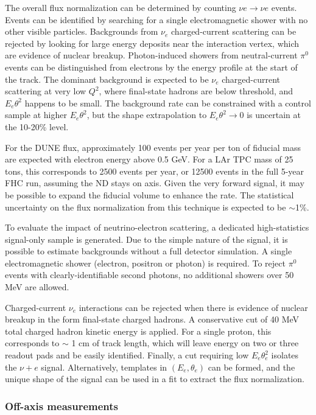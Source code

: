 The overall flux normalization can be determined by counting $\nu e \rightarrow \nu e$ events. Events can be identified by searching for a single electromagnetic shower with no other visible particles. Backgrounds from $\nu_{e}$ charged-current scattering can be rejected by looking for large energy deposits near the interaction vertex, which are evidence of nuclear breakup. Photon-induced showers from neutral-current $\pi^{0}$ events can be distinguished from electrons by the energy profile at the start of the track. The dominant background is expected to be $\nu_{e}$ charged-current scattering at very low $Q^{2}$, where final-state hadrons are below threshold, and $E_{e}\theta^{2}$ happens to be small. The background rate can be constrained with a control sample at higher $E_{e}\theta^{2}$, but the shape extrapolation to $E_{e}\theta^{2} \rightarrow 0$ is uncertain at the 10-20\% level.

For the DUNE flux, approximately 100 events per year per ton of fiducial mass are expected with electron energy above 0.5 GeV. For a LAr TPC mass of 25 tons, this corresponds to 2500 events per year, or 12500 events in the full 5-year FHC run, assuming the ND stays on axis. Given the very forward signal, it may be possible to expand the fiducial volume to enhance the rate. The statistical uncertainty on the flux normalization from this technique is expected to be $\sim$1\%.

To evaluate the impact of neutrino-electron scattering, a dedicated high-statistics signal-only sample is generated. Due to the simple nature of the signal, it is possible to estimate backgrounds without a full detector simulation. A single electromagnetic shower (electron, positron or photon) is required. To reject $\pi^{0}$ events with clearly-identifiable second photons, no additional showers over 50 MeV are allowed.

Charged-current $\nu_{e}$ interactions can be rejected when there is evidence of nuclear breakup in the form final-state charged hadrons. A conservative cut of 40 MeV total charged hadron kinetic energy is applied. For a single proton, this corresponds to $\sim$ 1 cm of track length, which will leave energy on two or three readout pads and be easily identified. Finally, a cut requiring low $E_{e}\theta_{e}^{2}$ isolates the $\nu+e$ signal. Alternatively, templates in $(E_{e}, \theta_{e})$ can be formed, and the unique shape of the signal can be used in a fit to extract the flux normalization.

\subsubsection{Off-axis  measurements}
\label{sec:ch-nu-osc-06-ndconcept-offaxis}

